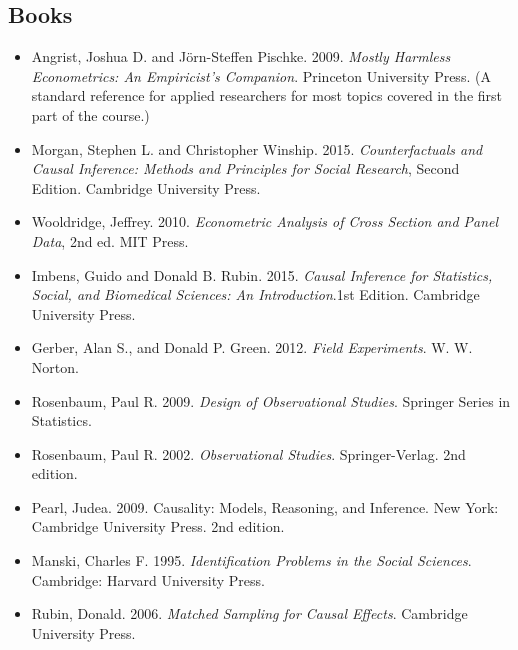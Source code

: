 \documentclass{article}
\begin{document}
\subsection*{Books}
\begin{itemize}
  \item Angrist, Joshua D. and J\"orn-Steffen Pischke. 2009. \emph{Mostly Harmless Econometrics: An Empiricist's Companion}. Princeton University Press. (A standard reference for applied researchers for most topics covered in the first part of the course.)
  \item Morgan, Stephen L. and Christopher Winship. 2015. \emph{Counterfactuals and Causal Inference: Methods and Principles for Social Research}, Second Edition. Cambridge University Press. 
  \item Wooldridge, Jeffrey. 2010. {\it Econometric Analysis of Cross Section and Panel Data}, 2nd ed. MIT Press.
\item Imbens, Guido and Donald B. Rubin. 2015. {\it Causal Inference for Statistics, Social, and Biomedical Sciences: An Introduction}.1st Edition. Cambridge University Press.
\item Gerber, Alan S., and Donald P. Green. 2012. \textit{Field Experiments}. W. W. Norton. 
\item Rosenbaum, Paul R. 2009. \textit{Design of Observational Studies}.  Springer Series in Statistics.
    \item Rosenbaum, Paul R. 2002. \textit{Observational Studies}. Springer-Verlag. 2nd edition.
  \item Pearl, Judea. 2009. Causality: Models, Reasoning, and Inference. New York: Cambridge University Press. 2nd edition. 
        \item Manski, Charles F. 1995. \textit{Identification Problems in the Social Sciences}. Cambridge: Harvard University Press.
  \item Rubin, Donald. 2006. \textit{Matched Sampling for Causal Effects}. Cambridge University Press.
\end{itemize}
\end{document}

